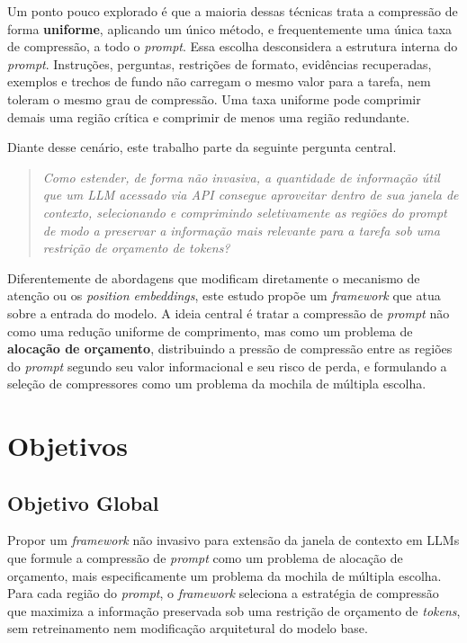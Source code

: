 Um ponto pouco explorado é que a maioria dessas técnicas trata a compressão de forma \textbf{uniforme}, aplicando um único método, e frequentemente uma única taxa de compressão, a todo o \textit{prompt}. Essa escolha desconsidera a estrutura interna do \textit{prompt}. Instruções, perguntas, restrições de formato, evidências recuperadas, exemplos e trechos de fundo não carregam o mesmo valor para a tarefa, nem toleram o mesmo grau de compressão. Uma taxa uniforme pode comprimir demais uma região crítica e comprimir de menos uma região redundante.

Diante desse cenário, este trabalho parte da seguinte pergunta central.

\begin{quote}
\itshape Como estender, de forma não invasiva, a quantidade de informação útil que um LLM acessado via API consegue aproveitar dentro de sua janela de contexto, selecionando e comprimindo seletivamente as regiões do \textit{prompt} de modo a preservar a informação mais relevante para a tarefa sob uma restrição de orçamento de \textit{tokens}?
\end{quote}

Diferentemente de abordagens que modificam diretamente o mecanismo de atenção ou os \textit{position embeddings}, este estudo propõe um \textit{framework} que atua sobre a entrada do modelo. A ideia central é tratar a compressão de \textit{prompt} não como uma redução uniforme de comprimento, mas como um problema de \textbf{alocação de orçamento}, distribuindo a pressão de compressão entre as regiões do \textit{prompt} segundo seu valor informacional e seu risco de perda, e formulando a seleção de compressores como um problema da mochila de múltipla escolha.

\section{Objetivos}
\label{sec:objetivos}

\subsection{Objetivo Global}
\label{subsec:objetivo-global}

Propor um \textit{framework} não invasivo para extensão da janela de contexto em LLMs que formule a compressão de \textit{prompt} como um problema de alocação de orçamento, mais especificamente um problema da mochila de múltipla escolha. Para cada região do \textit{prompt}, o \textit{framework} seleciona a estratégia de compressão que maximiza a informação preservada sob uma restrição de orçamento de \textit{tokens}, sem retreinamento nem modificação arquitetural do modelo base.

